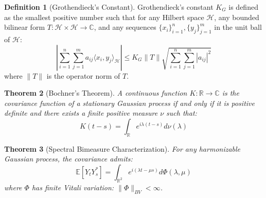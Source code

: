\documentclass{article}
\theoremstyle{plain}
\newtheorem{theorem}{Theorem}
\theoremstyle{definition}
\newtheorem{definition}[theorem]{Definition}
\begin{document}
\begin{definition}[Grothendieck's Constant]
Grothendieck's constant $K_G$ is defined as the smallest positive number such that for any Hilbert space $\mathcal{H}$, any bounded bilinear form $T: \mathcal{H} \times \mathcal{H} \to \mathbb{C}$, and any sequences $\{x_i\}_{i=1}^n, \{y_j\}_{j=1}^m$ in the unit ball of $\mathcal{H}$:
\begin{equation}
\left|\sum_{i=1}^n \sum_{j=1}^m a_{ij} \langle x_i, y_j \rangle_{\mathcal{H}}\right| \leq K_G \|T\| \sqrt{\sum_{i=1}^n\sum_{j=1}^m |a_{ij}|^2}
\end{equation}
where $\|T\|$ is the operator norm of $T$.
\end{definition}

\begin{theorem}[Bochner's Theorem]
A continuous function $K: \mathbb{R} \to \mathbb{C}$ is the covariance function of a stationary Gaussian process if and only if it is positive definite and there exists a finite positive measure $\nu$ such that:
\begin{equation}
K(t-s) = \int_{\mathbb{R}} e^{i\lambda(t-s)} d\nu(\lambda)
\end{equation}
\end{theorem}

\begin{theorem}[Spectral Bimeasure Characterization]
For any harmonizable Gaussian process, the covariance admits:
\begin{equation}
\mathbb{E}[Y_t Y_s^*] = \int_{\mathbb{R}^2} e^{i(\lambda t - \mu s)} d\Phi(\lambda, \mu)
\end{equation}
where $\Phi$ has finite Vitali variation: $\|\Phi\|_{BV} < \infty$.
\end{theorem}
\end{document}
